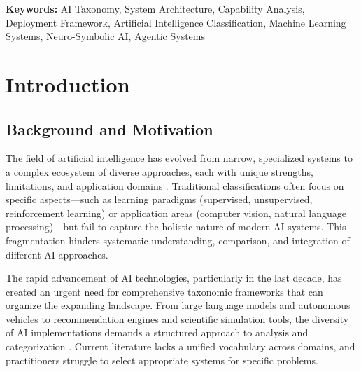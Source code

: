 \documentclass[12pt, a4paper]{article}
\begin{document}
\noindent\textbf{Keywords:} AI Taxonomy, System Architecture, Capability Analysis, Deployment Framework, Artificial Intelligence Classification, Machine Learning Systems, Neuro-Symbolic AI, Agentic Systems
\vspace{0.5em}

\section{Introduction}

\subsection{Background and Motivation}
The field of artificial intelligence has evolved from narrow, specialized systems to a complex ecosystem of diverse approaches, each with unique strengths, limitations, and application domains \cite{arrieta2020explainable, jordan2015machine, russell2021artificial}. Traditional classifications often focus on specific aspects---such as learning paradigms (supervised, unsupervised, reinforcement learning) \cite{bengio2013representation, lecun2015deep} or application areas (computer vision, natural language processing)---but fail to capture the holistic nature of modern AI systems. This fragmentation hinders systematic understanding, comparison, and integration of different AI approaches.

The rapid advancement of AI technologies, particularly in the last decade, has created an urgent need for comprehensive taxonomic frameworks that can organize the expanding landscape. From large language models \cite{bommasani2021opportunities, brown2020language} and autonomous vehicles to recommendation engines and scientific simulation tools, the diversity of AI implementations demands a structured approach to analysis and categorization \cite{goodfellow2016deep}. Current literature lacks a unified vocabulary across domains, and practitioners struggle to select appropriate systems for specific problems.
\end{document}
